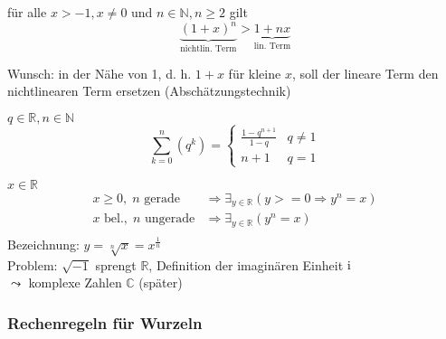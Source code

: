 \begin{proposition}
  für alle $x > -1, x \neq 0$ und $n \in \mathbb{N}, n \geq 2$ gilt
  \begin{equation*} \underbrace{(1+x)^n}_\text{nichtlin. Term} > \underbrace{1+nx}_\text{lin. Term} \end{equation*}
  \induction
\end{proposition}
%
Wunsch: in der Nähe von 1, d. h. $1+x$ für kleine $x$, soll der lineare Term den nichtlinearen Term ersetzen (Abschätzungstechnik)

\begin{theorem}\flush
 $q \in \mathbb{R}, n \in \mathbb{N}$
 \begin{equation*} \sum_{k=0}^n \left( q^k\right) = \begin{cases}\frac{1-q^{n+1}}{1-q} & q \neq 1 \\ n+1 & q = 1\end{cases} \end{equation*}
\end{theorem}

\induction

\begin{definition}[$n$-te Wurzel]\flush
 $x\in \mathbb{R}$
 \begin{align*}
  x \geq 0,\; n \text{ gerade} &\Rightarrow \exists_{y \in \mathbb{R}} \left( y >= 0 \Rightarrow y^n = x \right) \\
  x \text{ bel.},\; n \text{ ungerade} &\Rightarrow \exists_{y \in \mathbb{R}} \left( y^n = x \right) \\
 \end{align*}
Bezeichnung: $y = \sqrt[n]{x} = x^\frac 1 n$\\
Problem: $\sqrt{-1}$ sprengt $\mathbb{R}$, Definition der imaginären Einheit $\operatorname{i}$\\$\leadsto$ komplexe Zahlen $\mathbb{C}$ (später)
\end{definition}

\subsubsection*{Rechenregeln für Wurzeln}

